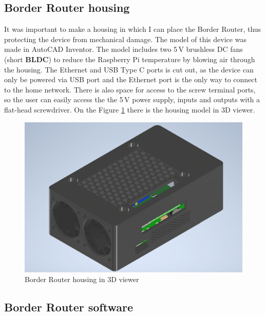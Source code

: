 \subsection{Border Router housing}
It was important to make a housing in which I can place the Border Router, thus protecting the device from mechanical damage. The model of this device was made in AutoCAD Inventor.
The model includes two 5\,\si{\volt} brushless DC fans (short \textbf{BLDC}) to reduce the Raspberry Pi temperature by blowing air through the housing. The Ethernet and USB Type C ports is cut out, as the device can only be powered via USB port and the Ethernet port is the only way to connect to the home network. There is also space for access to the screw terminal ports, so the user can easily access the the 5\,\si{\volt} power supply, inputs and outputs with a flat-head screwdriver. On the Figure \ref{fig:3dbd} there is the housing model in 3D viewer.
\begin{figure}
    \centering
    \includegraphics[width=\textwidth]{img/3ddoboz.png}
    \caption{Border Router housing in 3D viewer}
    \label{fig:3dbd}
\end{figure}


\subsection{Border Router software}
